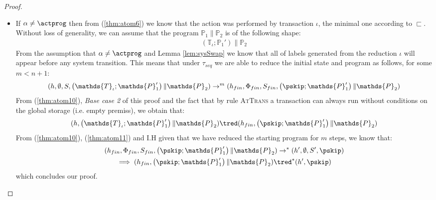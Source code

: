 \begin{thm}
{\begin{proof}
\begin{itemize}
	\item If $\alpha \neq \actprog$ then from (\ref{thm:atom6}) we know that the action was performed by transaction $\iota$, the minimal one according to $\sqsubset$. Without loss of generality, we can assume that the program $\mathds{P}_1 \| \mathds{P}_2$ is of the following shape:
	\begin{gather}
		\left( \mathds{T}_\iota ; \mathds{P}_1' \right) \| \mathds{P}_2
	\end{gather}
	From the assumption that $\alpha \neq \actprog$ and Lemma \ref{lem:sysSwap} we know that all of labels generated from the reduction $\iota$ will appear before any system transition. This means that under $\tau_{seq}$ we are able to reduce the initial state and program as follows, for some $m < n + 1$:
	\begin{gather}
		\label{thm:atom10}
		(h, \emptyset, S, \left( \mathds{T}_\iota ; \mathds{P}_1' \right) \| \mathds{P}_2) \rightarrow^{m} (h_{fin}, \Phi_{fin}, S_{fin}, \left( \pskip ; \mathds{P}_1' \right) \| \mathds{P}_2)
	\end{gather}
	From (\ref{thm:atom10}), \textit{Base case 2} of this proof and the fact that by rule \textsc{AtTrans} a transaction can always run without conditions on the global storage (i.e. empty premiss), we obtain that:
	\begin{gather}
		\label{thm:atom11}
		(h, \left( \mathds{T}_\iota ; \mathds{P}_1' \right) \| \mathds{P}_2) \tred (h_{fin}, \left( \pskip ; \mathds{P}_1' \right) \| \mathds{P}_2)
	\end{gather}
	From (\ref{thm:atom10}), (\ref{thm:atom11}) and I.H given that we have reduced the starting program for $m$ steps, we know that:
	\begin{gather}
		(h_{fin}, \Phi_{fin}, S_{fin}, \left( \pskip ; \mathds{P}_1' \right) \| \mathds{P}_2) \rightarrow^* (h', \emptyset, S', \pskip) \\
		\implies (h_{fin}, \left( \pskip ; \mathds{P}_1' \right) \| \mathds{P}_2) \tred^* (h', \pskip)
	\end{gather}
	which concludes our proof.
\end{itemize}
\end{proof}
}
\end{thm}